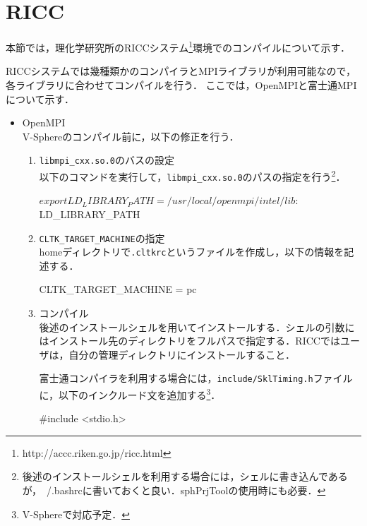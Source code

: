 
\graphicspath{{./fig5/}}

%
\section{RICC}
\label{sec:ricc}
本節では，理化学研究所のRICCシステム\footnote{http://accc.riken.go.jp/ricc.html}環境でのコンパイルについて示す．

RICCシステムでは幾種類かのコンパイラとMPIライブラリが利用可能なので，各ライブラリに合わせてコンパイルを行う．
ここでは，OpenMPIと富士通MPIについて示す．

\begin{itemize}
\item OpenMPI\\
V-Sphereのコンパイル前に，以下の修正を行う．
\begin{enumerate}
\item \verb|libmpi_cxx.so.0|のバスの設定\\
以下のコマンドを実行して，\verb|libmpi_cxx.so.0|のパスの指定を行う\footnote{後述のインストールシェルを利用する場合には，シェルに書き込んであるが，~/.bashrcに書いておくと良い．sphPrjToolの使用時にも必要．}．
{ \small
\begin{program}
$ export LD_LIBRARY_PATH=/usr/local/openmpi/intel/lib:$LD_LIBRARY_PATH
\end{program}}
\vspace{2mm}

\item \verb|CLTK_TARGET_MACHINE|の指定\\
homeディレクトリで\verb|.cltkrc|というファイルを作成し，以下の情報を記述する．
{ \small
\begin{program}
CLTK_TARGET_MACHINE = pc
\end{program}}
\vspace{2mm}

\item コンパイル\\
後述のインストールシェルを用いてインストールする．シェルの引数にはインストール先のディレクトリをフルパスで指定する．RICCではユーザは，自分の管理ディレクトリにインストールすること．
{ \small
{}}
\vspace{2mm}

富士通コンパイラを利用する場合には，\verb|include/SklTiming.h|ファイルに，以下のインクルード文を追加する\footnote{V-Sphereで対応予定．}．
{ \small
\begin{program}
#include <stdio.h>
\end{program}}
\vspace{2mm}
\end{enumerate}


\end{itemize}
